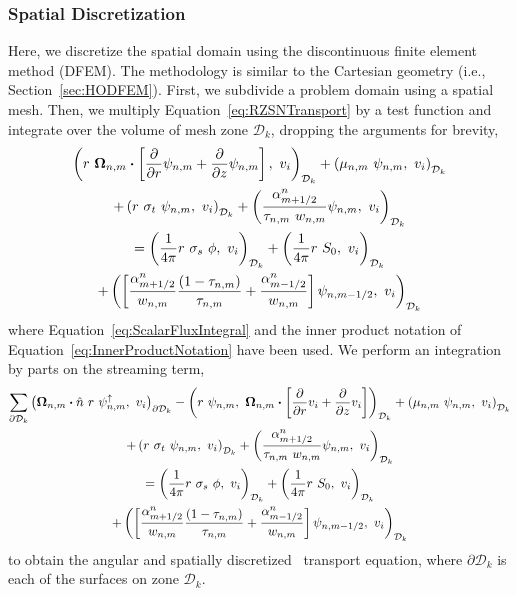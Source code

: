 \documentclass[12pt]{article}
\begin{document}
\subsubsection{Spatial Discretization}
\label{sec:RZSpatialDiscretization}
Here, we discretize the spatial domain using the discontinuous finite element method (DFEM). The methodology is similar to the Cartesian geometry (i.e., Section~\ref{sec:HODFEM}). First, we subdivide a problem domain using a spatial mesh. Then, we multiply Equation~\ref{eq:RZSNTransport} by a test function and integrate over the volume of mesh zone $\mathcal{D}_k$, dropping the arguments for brevity,
\begin{multline}
\left(r\ \bm{\Omega}_{n,m} \bm{\cdot} \left[\frac{\partial}{\partial r} \psi_{n,m} + \frac{\partial}{\partial z} \psi_{n,m} \right],\ v_{i} \right)_{\mathcal{D}_k} + \left(\mu_{n,m}\ \psi_{n,m},\ v_{i} \right)_{\mathcal{D}_k} \\
+ \left(r\ \sigma_t\ \psi_{n,m},\ v_{i} \right)_{\mathcal{D}_k} + \left(\frac{\alpha_{m+1/2}^n}{\tau_{n,m}\ w_{n,m}} \psi_{n,m},\ v_{i} \right)_{\mathcal{D}_k} \\
= \left(\frac{1}{4 \pi} r\ \sigma_s\ \phi,\ v_{i} \right)_{\mathcal{D}_k} + \left(\frac{1}{4 \pi} r\ S_0,\ v_{i} \right)_{\mathcal{D}_k} \\
+ \left(\left[\frac{\alpha_{m+1/2}^n}{w_{n,m}} \frac{(1-\tau_{n,m})}{\tau_{n,m}} + \frac{\alpha_{m-1/2}^n}{w_{n,m}} \right] \psi_{n,m-1/2},\ v_{i} \right)_{\mathcal{D}_k}
\end{multline}
%
where Equation~\ref{eq:ScalarFluxIntegral} and the inner product notation of Equation~\ref{eq:InnerProductNotation} have been used. We perform an integration by parts on the streaming term,
\begin{multline}
\sum_{\partial \mathcal{D}_k} \left(\vec{\Omega}_{n,m} \vd \hat{n}\ r\ \psi_{n,m}^\uparrow,\ v_{i} \right)_{\partial \mathcal{D}_k} - \left(r\ \psi_{n,m},\ \vec{\Omega}_{n,m} \vd \left[\frac{\partial}{\partial r} v_{i} + \frac{\partial}{\partial z} v_{i} \right] \right)_{\mathcal{D}_k} + \left(\mu_{n,m}\ \psi_{n,m},\ v_{i} \right)_{\mathcal{D}_k} \\
+ \left(r\ \sigma_t\ \psi_{n,m},\ v_{i} \right)_{\mathcal{D}_k} + \left(\frac{\alpha_{m+1/2}^n}{\tau_{n,m}\ w_{n,m}} \psi_{n,m},\ v_{i} \right)_{\mathcal{D}_k} \\
= \left(\frac{1}{4 \pi} r\ \sigma_s\ \phi,\ v_{i} \right)_{\mathcal{D}_k} + \left(\frac{1}{4 \pi} r\ S_0,\ v_{i} \right)_{\mathcal{D}_k} \\
+ \left(\left[\frac{\alpha_{m+1/2}^n}{w_{n,m}} \frac{(1-\tau_{n,m})}{\tau_{n,m}} + \frac{\alpha_{m-1/2}^n}{w_{n,m}} \right] \psi_{n,m-1/2},\ v_{i} \right)_{\mathcal{D}_k}
\end{multline}
%
\noindent to obtain the angular and spatially discretized \RZ\ transport equation, where $\partial \mathcal{D}_k$ is each of the surfaces on zone $\mathcal{D}_k$.
\end{document}
